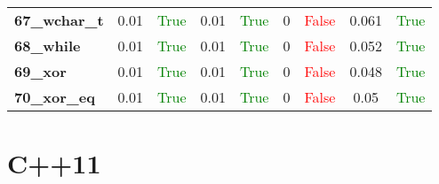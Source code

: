\documentclass{article}
\begin{document}
\begin{xltabular}{\textwidth}{lcccccccc}
\textbf{67\_wchar\_t}& 0.01&\textcolor{green}{True}& 0.01&\textcolor{green}{True}& 0&\textcolor{red}{False}& 0.061&\textcolor{green}{True} \\[0.5ex]
\textbf{68\_while}& 0.01&\textcolor{green}{True}& 0.01&\textcolor{green}{True}& 0&\textcolor{red}{False}& 0.052&\textcolor{green}{True} \\[0.5ex]
\textbf{69\_xor}& 0.01&\textcolor{green}{True}& 0.01&\textcolor{green}{True}& 0&\textcolor{red}{False}& 0.048&\textcolor{green}{True} \\[0.5ex]
\textbf{70\_xor\_eq}& 0.01&\textcolor{green}{True}& 0.01&\textcolor{green}{True}& 0&\textcolor{red}{False}& 0.05&\textcolor{green}{True} \\[0.5ex]
\bottomrule
\end{xltabular}
\newpage
\section{C++11}
\end{document}
